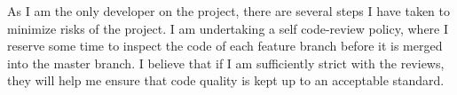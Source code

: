 As I am the only developer on the project, there are several steps I have taken to minimize risks of the project.
I am undertaking a self code-review policy, where I reserve some time to inspect the code of each feature branch before it is merged into the master branch.
I believe that if I am sufficiently strict with the reviews, they will help me ensure that code quality is kept up to an acceptable standard.